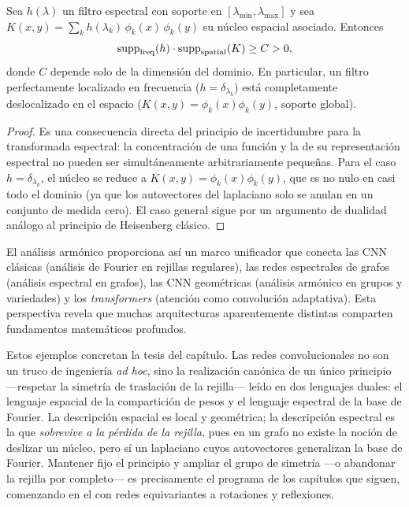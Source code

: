 \begin{proposition}
\label{prop:grids:loc-global}
Sea $h(\lambda)$ un filtro espectral con soporte en
$[\lambda_{\min}, \lambda_{\max}]$ y sea
$K(x,y) = \sum_k h(\lambda_k)\, \phi_k(x)\,\phi_k(y)$ su n\'ucleo espacial
asociado. Entonces
\[
  \operatorname{supp}_{\mathrm{freq}}(h) \cdot \operatorname{supp}_{\mathrm{spatial}}(K) \geq C > 0,
\]
donde $C$ depende solo de la dimensi\'on del dominio. En particular, un filtro
perfectamente localizado en frecuencia ($h = \delta_{\lambda_k}$) est\'a
completamente deslocalizado en el espacio ($K(x,y) = \phi_k(x)\phi_k(y)$, soporte
global).
\end{proposition}

\begin{proof}
Es una consecuencia directa del principio de incertidumbre para la transformada
espectral: la concentraci\'on de una funci\'on y la de su representaci\'on
espectral no pueden ser simult\'aneamente arbitrariamente peque\~nas. Para el
caso $h = \delta_{\lambda_k}$, el n\'ucleo se reduce a
$K(x,y) = \phi_k(x)\phi_k(y)$, que es no nulo en casi todo el dominio (ya que los
autovectores del laplaciano solo se anulan en un conjunto de medida cero). El
caso general sigue por un argumento de dualidad an\'alogo al principio de
Heisenberg cl\'asico.
\end{proof}

El an\'alisis arm\'onico proporciona as\'i un marco unificador que conecta las
CNN cl\'asicas (an\'alisis de Fourier en rejillas regulares), las redes
espectrales de grafos (an\'alisis espectral en grafos), las CNN geom\'etricas
(an\'alisis arm\'onico en grupos y variedades) y los \emph{transformers}
(atenci\'on como convoluci\'on adaptativa). Esta perspectiva revela que muchas
arquitecturas aparentemente distintas comparten fundamentos matem\'aticos
profundos.

Estos ejemplos concretan la tesis del cap\'itulo. Las redes convolucionales no
son un truco de ingenier\'ia \emph{ad hoc}, sino la realizaci\'on can\'onica de
un \'unico principio ---respetar la simetr\'ia de traslaci\'on de la rejilla---
le\'ido en dos lenguajes duales: el lenguaje espacial de la compartici\'on de
pesos y el lenguaje espectral de la base de Fourier. La descripci\'on espacial es
local y geom\'etrica; la descripci\'on espectral es la que \emph{sobrevive a la
p\'erdida de la rejilla}, pues en un grafo no existe la noci\'on de deslizar un
n\'ucleo, pero s\'i un laplaciano cuyos autovectores generalizan la base de
Fourier. Mantener fijo el principio y ampliar el grupo de simetr\'ia ---o
abandonar la rejilla por completo--- es precisamente el programa de los
cap\'itulos que siguen, comenzando en el  con redes equivariantes
a rotaciones y reflexiones.
